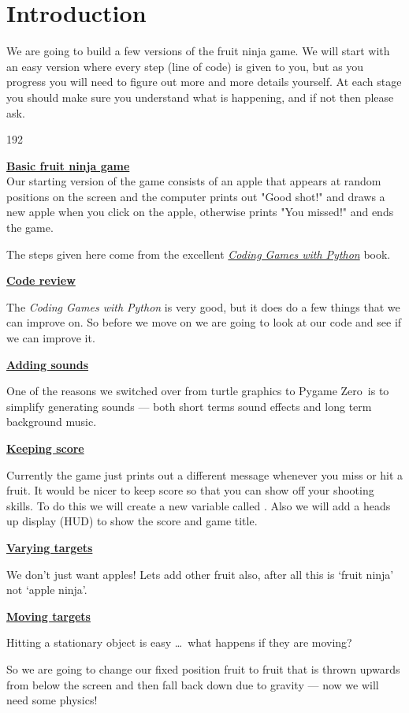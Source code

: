 \documentclass{coderdojo}
\def\pygameZero{{\pygameZeroFont Pygame Zero}}
\newcommand\contentsitem[2]{
	\item \hyperref[#1]{\color{section}\bfseries #2}
}
\begin{document}
\maketitle

\section*{Introduction}

We are going to build a few versions of the fruit ninja game. We will start with an easy version where every step (line of code) is given to you, but as you progress you will need to figure out more and more details yourself. At each stage you should make sure you understand what is happening, and if not then please ask.

\begin{dingautolist}{192} 
\contentsitem{ball}{Basic fruit ninja game}\\
Our starting version of the game consists of an apple that appears at random positions on the screen and the computer prints out  "Good shot!" and draws a new apple when you click on the apple, otherwise prints "You missed!" and ends the game.
 
The steps given here come from the excellent \href{https://www.dk.com/uk/book/9780241317792-computer-coding-python-games-for-kids/}{\em Coding Games with Python} book.

\contentsitem{review}{Code review}

The {\em Coding Games with Python} is very good, but it does do a few things that we can improve on. So before we move on we are going to look at our code and see if we can improve it.

\contentsitem{rectangle}{Adding sounds}

One of the reasons we switched over from turtle graphics to \pygameZero\ is to simplify generating sounds --- both short terms sound effects and long term background music. 

\contentsitem{rectangle}{Keeping score}

Currently the game just prints out a different message whenever you miss or hit a fruit. It would be nicer to keep score so that you can show off your shooting skills.  To do this we will create a new variable called .  Also we will add a heads up display (HUD) to show the score and game title.    

\contentsitem{rectangle}{Varying targets} 

We don't just want apples! Lets add other fruit also, after all this is `fruit ninja' not `apple ninja'.

\contentsitem{rectangle}{Moving targets}

Hitting a stationary object is easy \ldots\ what happens if they are moving?

So we are going to change our fixed position fruit to fruit that is thrown upwards from below the screen and then fall back down due to gravity --- now we will need some physics!

\end{dingautolist}
\end{document}
